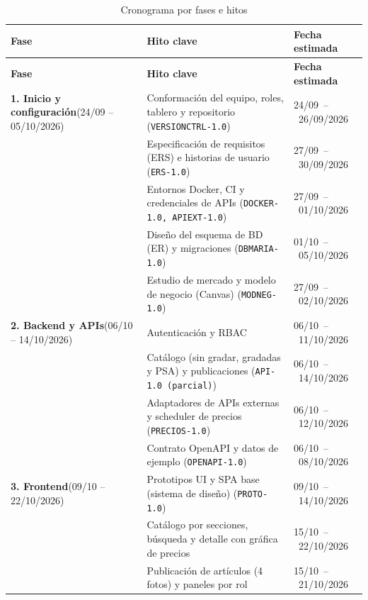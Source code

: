 \documentclass[letterpaper,11pt]{article}
\begin{document}
\begin{longtable}{|>{\raggedright\arraybackslash}p{3.1cm}|>{\raggedright\arraybackslash}p{7.1cm}|>{\raggedright\arraybackslash}p{3.7cm}|}
\caption{Cronograma por fases e hitos}\\
\hline
\textbf{Fase} & \textbf{Hito clave} & \textbf{Fecha estimada} \\ \hline
\endfirsthead
\hline
\textbf{Fase} & \textbf{Hito clave} & \textbf{Fecha estimada} \\ \hline
\endhead
\textbf{1. Inicio y configuración}\newline (24/09 -- 05/10/2026) & Conformación del equipo, roles, tablero y repositorio (\texttt{VERSIONCTRL-1.0}) & \mbox{24/09 -- 26/09/2026} \\
\cline{2-3}
 & Especificación de requisitos (ERS) e historias de usuario (\texttt{ERS-1.0}) & \mbox{27/09 -- 30/09/2026} \\
\cline{2-3}
 & Entornos Docker, CI y credenciales de APIs (\texttt{DOCKER-1.0, APIEXT-1.0}) & \mbox{27/09 -- 01/10/2026} \\
\cline{2-3}
 & Diseño del esquema de BD (ER) y migraciones (\texttt{DBMARIA-1.0}) & \mbox{01/10 -- 05/10/2026} \\
\cline{2-3}
 & Estudio de mercado y modelo de negocio (Canvas) (\texttt{MODNEG-1.0}) & \mbox{27/09 -- 02/10/2026} \\
\hline
\textbf{2. Backend y APIs}\newline (06/10 -- 14/10/2026) & Autenticación y RBAC & \mbox{06/10 -- 11/10/2026} \\
\cline{2-3}
 & Catálogo (sin gradar, gradadas y PSA) y publicaciones (\texttt{API-1.0 (parcial)}) & \mbox{06/10 -- 14/10/2026} \\
\cline{2-3}
 & Adaptadores de APIs externas y scheduler de precios (\texttt{PRECIOS-1.0}) & \mbox{06/10 -- 12/10/2026} \\
\cline{2-3}
 & Contrato OpenAPI y datos de ejemplo (\texttt{OPENAPI-1.0}) & \mbox{06/10 -- 08/10/2026} \\
\hline
\textbf{3. Frontend}\newline (09/10 -- 22/10/2026) & Prototipos UI y SPA base (sistema de diseño) (\texttt{PROTO-1.0}) & \mbox{09/10 -- 14/10/2026} \\
\cline{2-3}
 & Catálogo por secciones, búsqueda y detalle con gráfica de precios & \mbox{15/10 -- 22/10/2026} \\
\cline{2-3}
 & Publicación de artículos (4 fotos) y paneles por rol & \mbox{15/10 -- 21/10/2026} \\

\end{longtable}
\end{document}
